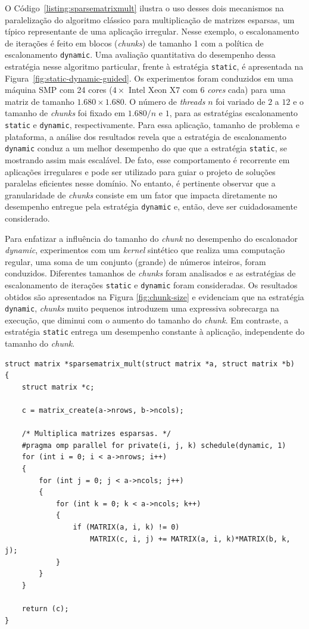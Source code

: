 \documentclass{SBCbookchapter}
\begin{document}
		O Código~\ref{listing:sparsematrixmult} ilustra o uso desses dois
		mecanismos na paralelização do algoritmo clássico para multiplicação
		de matrizes esparsas, um típico representante de uma aplicação
		irregular. Nesse exemplo, o escalonamento de iterações é feito em
		blocos (\textit{chunks}) de tamanho 1 com a política de
		escalonamento \texttt{dynamic}. Uma avaliação quantitativa do
		desempenho dessa estratégia nesse algoritmo particular, frente à
		estratégia \texttt{static}, é apresentada na
		Figura~\ref{fig:static-dynamic-guided}. Os experimentos foram
		conduzidos em uma máquina SMP com 24 cores ($4 \times$ Intel Xeon
		X7 com 6 \textit{cores} cada) para uma matriz de tamanho $1.680 \times 1.680$. 
		O número de \textit{threads} $n$ foi variado de $2$ a $12$ e o tamanho de
		\textit{chunks} foi fixado em $1.680/n$ e $1$, para as estratégias
		escalonamento \texttt{static} e \texttt{dynamic}, respectivamente.
		Para essa aplicação, tamanho de problema e plataforma, a análise dos
		resultados revela que a estratégia de escalonamento \texttt{dynamic}
		conduz a um melhor desempenho do que que a estratégia
		\texttt{static}, se mostrando assim mais escalável.  De fato, esse
		comportamento é recorrente em aplicações irregulares e pode ser
		utilizado para guiar o projeto de soluções paralelas eficientes
		nesse domínio. No entanto, é pertinente observar que a
		granularidade de \textit{chunks} consiste em um fator que impacta
		diretamente no desempenho entregue pela estratégia \texttt{dynamic}
		e, então, deve ser cuidadosamente considerado. 

		Para enfatizar a influência do tamanho do \textit{chunk} no
		desempenho do escalonador \textit{dynamic}, experimentos com um
		\textit{kernel} sintético que realiza uma computação regular,
		uma soma de um conjunto (grande) de números inteiros, foram
		conduzidos. Diferentes tamanhos de \textit{chunks} foram
		analisados e as estratégias de escalonamento de iterações
		\texttt{static} e \texttt{dynamic} foram consideradas. Os
		resultados obtidos são apresentados na Figura \ref{fig:chunk-size}
		e evidenciam que na estratégia \texttt{dynamic},
		\textit{chunks} muito pequenos introduzem uma expressiva
		sobrecarga na execução, que diminui com o aumento do tamanho do
		\textit{chunk}. Em contraste, a estratégia \texttt{static}
		entrega um desempenho constante à aplicação, independente do
		tamanho do \textit{chunk}.

\begin{lstlisting}[frame=single, caption=Exemplo de multiplicação de matrizes esparsas.,
label=listing:sparsematrixmult]
struct matrix *sparsematrix_mult(struct matrix *a, struct matrix *b)
{
	struct matrix *c;

	c = matrix_create(a->nrows, b->ncols);

	/* Multiplica matrizes esparsas. */
	#pragma omp parallel for private(i, j, k) schedule(dynamic, 1)
	for (int i = 0; i < a->nrows; i++)
	{
		for (int j = 0; j < a->ncols; j++)
		{
			for (int k = 0; k < a->ncols; k++)
			{
				if (MATRIX(a, i, k) != 0)
					MATRIX(c, i, j) += MATRIX(a, i, k)*MATRIX(b, k, j);
			}
		}
	}

	return (c);
}
\end{lstlisting}
\end{document}

